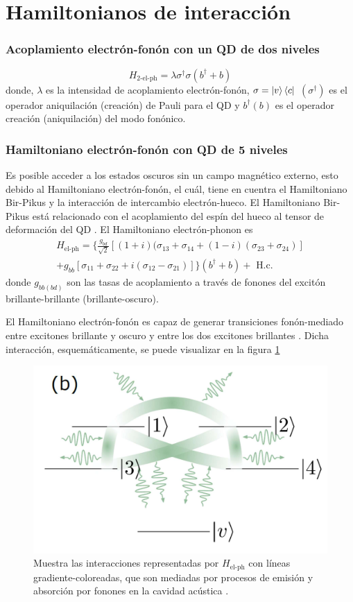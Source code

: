 \documentclass[../main.tex]{subfiles}
\begin{document}
\section{Hamiltonianos de interacción}

\subsubsection{Acoplamiento electrón-fonón con un QD de dos niveles}
\begin{equation}
	H_\text{2-el-ph} = \lambda \sigma^\dagger \sigma (b^\dagger + b)
\end{equation}
donde, $\lambda$ es la intensidad de acoplamiento electrón-fonón, $\sigma = \ket{v}\bra{c}$  $(\sigma^\dagger)$ es el operador aniquilación (creación) de Pauli para el QD y $b^\dagger (b)$ es el operador creación (aniquilación) del modo fonónico.

\subsubsection{Hamiltoniano electrón-fonón con QD de 5 niveles}
Es posible acceder a los estados oscuros sin un campo magnético externo, esto debido al Hamiltoniano electrón-fonón, el cuál, tiene en cuentra el Hamiltoniano Bir-Pikus y la interacción de intercambio electrón-hueco. El Hamiltoniano Bir-Pikus está relacionado con el acoplamiento del espín del hueco al tensor de deformación del QD \parencite{Woods2004}. El Hamiltoniano electrón-phonon es
\begin{multline}\label{eq:H_el-ph}
	H_\text{el-ph} = \big\{\frac{g_{bd}}{\sqrt{2}}[(1+i)(\sigma_{13} + \sigma_{14} + (1-i)(\sigma_{23} + \sigma_{24})]\\ + g_{bb} [\sigma_{11} + \sigma_{22} + i(\sigma_{12} - \sigma_{21})] \big\} (b^\dagger + b) + \text{ H.c.}
\end{multline}
donde $g_{bb(bd)}$ son las tasas de acoplamiento a través de fonones del excitón brillante-brillante (brillante-oscuro).

El Hamiltoniano electrón-fonón es capaz de generar transiciones fonón-mediado entre excitones brillante y oscuro y entre los dos excitones brillantes \parencite{Roszak2007}. Dicha interacción, esquemáticamente, se puede visualizar en la figura \ref{fig:electron-phonon}
\begin{figure}[th]
	\centering
	\includegraphics[width=0.35\linewidth]{img/electron-phonon}
	\caption{Muestra las interacciones representadas por $H_\text{el-ph}$ con líneas gradiente-coloreadas, que son mediadas por procesos de emisión y absorción por fonones en la cavidad acústica \parencite{Vargas2022}.}
	\label{fig:electron-phonon}
\end{figure}
\end{document}
